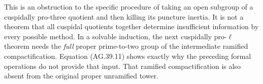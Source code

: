This is an obstruction to the specific procedure of taking
an open subgroup of a cuspidally pro-three quotient and then
killing its puncture inertia. It is not a theorem that all
cuspidal quotients together determine insufficient information
by every possible method. In a solvable induction, the next
cuspidally pro-\(\ell\) theorem needs the \emph{full} proper
prime-to-two group of the intermediate ramified compactification.
Equation (AG.39.11) shows exactly why the preceding formal
operations do not provide that input. That ramified
compactification is also absent from the original proper
unramified tower.

